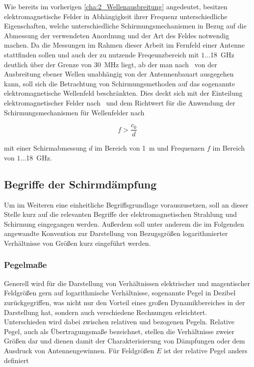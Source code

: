 Wie bereits im vorherigen \Abschnitt \ref{cha:2_Wellenausbreitung} angedeutet, besitzen elektromagnetische Felder in Abhängigkeit ihrer Frequenz unterschiedliche Eigenschaften, welche unterschiedliche Schirmungsmechanismen in Bezug auf die Abmessung der verwendeten Anordnung und der Art des Feldes notwendig machen. Da die Messungen im Rahmen dieser Arbeit im Fernfeld einer Antenne stattfinden sollen und auch der zu nutzende Freqeunzbereich mit $1\ldots$\SI{18}{\giga\hertz} deutlich über der Grenze von \SI{30}{\mega\hertz} liegt, ab der man nach~\cite{Design_of_shielded_enclosures} von der Ausbreitung ebener Wellen unabhängig von der Antennenbauart ausgegehen kann, soll sich die Betrachtung von Schirmungsmethoden auf das sogenannte elektromagnetische Wellenfeld beschränkten. Dies deckt sich mit der Einteilung elektromagnetischer Felder nach~\cite{Feldtheorie_Begriffe} und dem Richtwert für die Anwendung der Schirmungsmechanismen für Wellenfelder nach~\cite{EM_Schirmung}

\begin{equation}
    f > \frac{c_0}{d}
\end{equation}

mit einer Schirmabmessung $d$ im Bereich von \SI{1}{\meter} und Frequenzen $f$ im Bereich von $1\ldots$\SI{18}{\giga\hertz}.




\subsection{Begriffe der Schirmdämpfung}\label{cha:2_sub_Begriff_der_Schirmdaempfung}

Um im Weiteren eine einheitliche Begriffsgrundlage vorauszusetzen, soll an dieser Stelle kurz auf die relevanten Begriffe der elektromagnetischen Strahlung und Schirmung eingegangen werden. Außerdem soll unter anderem die im Folgenden angewandte Konvention zur Darstellung von Bezugsgrößen logarithmierter Verhältnisse von Größen kurz eingeführt werden. 

\subsubsection{Pegelmaße}

Generell wird für die Darstellung von Verhältnissen elektrischer und magentischer Feldgrößen gern auf logarithmische Verhältnisse, sogenannte Pegel in Dezibel zurückgegriffen, was nicht nur den Vorteil eines großen Dynamikbereiches in der Darstellung hat, sondern auch verschiedene Rechnungen erleichtert. Unterschieden wird dabei zwischen relativen und bezogenen Pegeln. Relative Pegel, auch als Übertragungsmaße bezeichnet, stellen die Verhältnisse zweier Größen dar und dienen damit der Charakterisierung von Dämpfungen oder dem Ausdruck von Antennengewinnen. Für Feldgrößen $E$ ist der relative Pegel anders definiert~\cite{EM_Schirmung}

